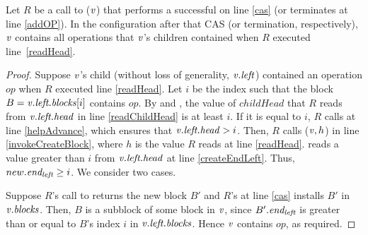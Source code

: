 \begin{lemma}\label{successfulRefresh}
Let $R$ be a call to ($\mbox{\textnormal{\textit{v}}}$) that performs a successful  on line \ref{cas} (or terminates at line \ref{addOP}).
In the configuration after that CAS (or termination, respectively), $\mbox{\textnormal{\textit{v}}}$ contains all operations that $\mbox{\textnormal{\textit{v}}}$'s children contained 
when $R$ executed line~\ref{readHead}.
\end{lemma}
\begin{proof}
Suppose $\mbox{\textnormal{\textit{v}}}$'s child (without loss of generality, $\mbox{\textnormal{\textit{v}}}.\mbox{\textit{left}}$) contained an operation $op$ 
when $R$ executed line \ref{readHead}.
Let $i$ be the index such that the block $B=\mbox{\textnormal{\textit{v}}}.\mbox{\textit{left.blocks}}[i]$ contains $op$.
By  and , the value of $childHead$ that $R$ reads from
$\mbox{\textnormal{\textit{v}}}.\mbox{\textit{left.head}}$ in line \ref{readChildHead} is at least $i$.
If it is equal to $i$, $R$ calls  at line \ref{helpAdvance}, which ensures that 
$\mbox{\textnormal{\textit{v}}}.\mbox{\textit{left.head}} > i$.
Then, $R$ calls ($\mbox{\textnormal{\textit{v}}},h$) in line \ref{invokeCreateBlock}, where $h$ is the value $R$ reads at line \ref{readHead}.
 reads a value greater than $i$ from $\mbox{\textnormal{\textit{v}}}.\mbox{\textit{left.head}}$ at line \ref{createEndLeft}.
Thus, $new.\mbox{\textit{end\textsubscript{left}}} \geq i$.  We consider two cases.

Suppose $R$'s call to  returns the new block $B'$ and $R$'s  at line \ref{cas} 
installs $B'$ in $\mbox{\textnormal{\textit{v}}}.\mbox{\textit{blocks}}$.
Then, $B$ is a subblock of some block in $\mbox{\textnormal{\textit{v}}}$, since  $B'.\mbox{\textit{end\textsubscript{left}}}$ is greater than or equal to $B$'s index
$i$ in $\mbox{\textnormal{\textit{v}}}.\mbox{\textit{left.blocks}}$.
Hence $\mbox{\textnormal{\textit{v}}}$ contains $op$, as required.


\end{proof}
